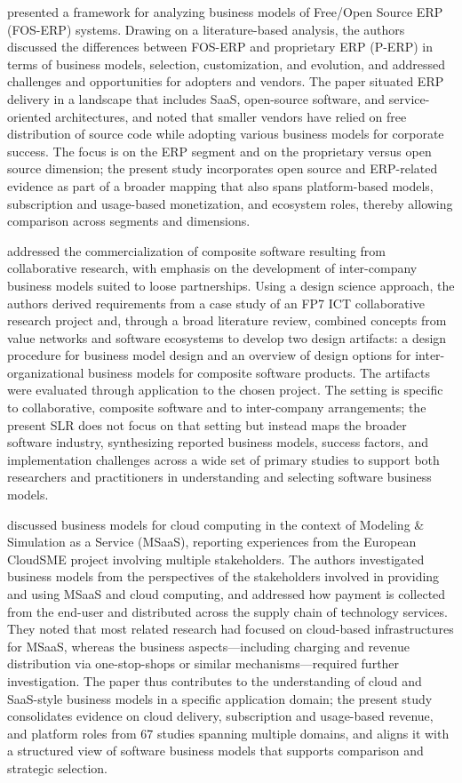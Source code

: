 \documentclass[journal]{IEEEtran}
\begin{document}
\cite{olson2018open} presented a framework for analyzing business models of Free/Open Source ERP (FOS-ERP) systems. Drawing on a literature-based analysis, the authors discussed the differences between FOS-ERP and proprietary ERP (P-ERP) in terms of business models, selection, customization, and evolution, and addressed challenges and opportunities for adopters and vendors. The paper situated ERP delivery in a landscape that includes SaaS, open-source software, and service-oriented architectures, and noted that smaller vendors have relied on free distribution of source code while adopting various business models for corporate success. The focus is on the ERP segment and on the proprietary versus open source dimension; the present study incorporates open source and ERP-related evidence as part of a broader mapping that also spans platform-based models, subscription and usage-based monetization, and ecosystem roles, thereby allowing comparison across segments and dimensions.

\cite{stanoevska2015commercialization} addressed the commercialization of composite software resulting from collaborative research, with emphasis on the development of inter-company business models suited to loose partnerships. Using a design science approach, the authors derived requirements from a case study of an FP7 ICT collaborative research project and, through a broad literature review, combined concepts from value networks and software ecosystems to develop two design artifacts: a design procedure for business model design and an overview of design options for inter-organizational business models for composite software products. The artifacts were evaluated through application to the chosen project. The setting is specific to collaborative, composite software and to inter-company arrangements; the present SLR does not focus on that setting but instead maps the broader software industry, synthesizing reported business models, success factors, and implementation challenges across a wide set of primary studies to support both researchers and practitioners in understanding and selecting software business models.

\cite{kiss2015business} discussed business models for cloud computing in the context of Modeling \& Simulation as a Service (MSaaS), reporting experiences from the European CloudSME project involving multiple stakeholders. The authors investigated business models from the perspectives of the stakeholders involved in providing and using MSaaS and cloud computing, and addressed how payment is collected from the end-user and distributed across the supply chain of technology services. They noted that most related research had focused on cloud-based infrastructures for MSaaS, whereas the business aspects---including charging and revenue distribution via one-stop-shops or similar mechanisms---required further investigation. The paper thus contributes to the understanding of cloud and SaaS-style business models in a specific application domain; the present study consolidates evidence on cloud delivery, subscription and usage-based revenue, and platform roles from 67 studies spanning multiple domains, and aligns it with a structured view of software business models that supports comparison and strategic selection.
\end{document}
